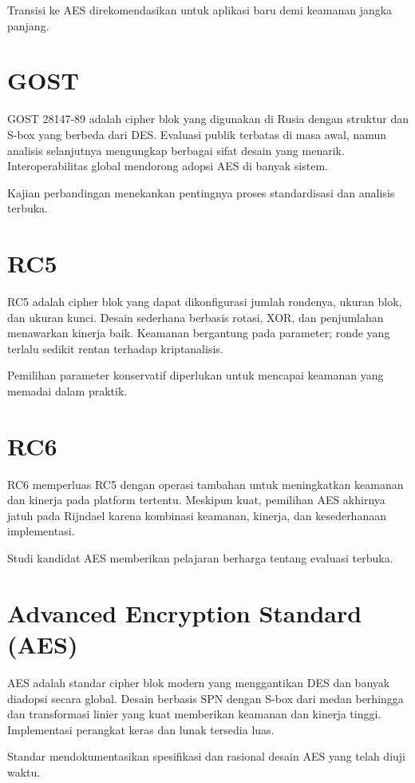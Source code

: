 \documentclass[../main.tex]{subfiles}
\begin{document}
Transisi ke AES direkomendasikan untuk aplikasi baru demi keamanan jangka panjang.

\section{GOST}
GOST 28147-89 adalah cipher blok yang digunakan di Rusia dengan struktur dan S-box yang berbeda dari DES. Evaluasi publik terbatas di masa awal, namun analisis selanjutnya mengungkap berbagai sifat desain yang menarik. Interoperabilitas global mendorong adopsi AES di banyak sistem.

Kajian perbandingan menekankan pentingnya proses standardisasi dan analisis terbuka.

\section{RC5}
RC5 adalah cipher blok yang dapat dikonfigurasi jumlah rondenya, ukuran blok, dan ukuran kunci. Desain sederhana berbasis rotasi, XOR, dan penjumlahan menawarkan kinerja baik. Keamanan bergantung pada parameter; ronde yang terlalu sedikit rentan terhadap kriptanalisis.

Pemilihan parameter konservatif diperlukan untuk mencapai keamanan yang memadai dalam praktik.

\section{RC6}
RC6 memperluas RC5 dengan operasi tambahan untuk meningkatkan keamanan dan kinerja pada platform tertentu. Meskipun kuat, pemilihan AES akhirnya jatuh pada Rijndael karena kombinasi keamanan, kinerja, dan kesederhanaan implementasi.

Studi kandidat AES memberikan pelajaran berharga tentang evaluasi terbuka.

\section{Advanced Encryption Standard (AES)}
AES adalah standar cipher blok modern yang menggantikan DES dan banyak diadopsi secara global. Desain berbasis SPN dengan S-box dari medan berhingga dan transformasi linier yang kuat memberikan keamanan dan kinerja tinggi. Implementasi perangkat keras dan lunak tersedia luas.

Standar \textcite{fips197} mendokumentasikan spesifikasi dan rasional desain AES yang telah diuji waktu.
\end{document}
